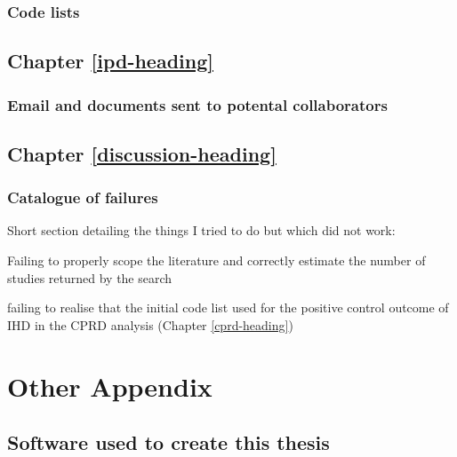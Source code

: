 \documentclass[a4paper, twoside]{templates/ociamthesis}
\begin{document}
\hypertarget{code-lists}{%
\subsection{Code lists}\label{code-lists}}

\hypertarget{appendix-ipd-analysis}{%
\section{Chapter \ref{ipd-heading}}\label{appendix-ipd-analysis}}

\hypertarget{ipd-email-collab}{%
\subsection{Email and documents sent to potental collaborators}\label{ipd-email-collab}}

\hypertarget{chapter-refdiscussion-heading}{%
\section{Chapter \ref{discussion-heading}}\label{chapter-refdiscussion-heading}}

\hypertarget{appendix-catalogue-failures}{%
\subsection{Catalogue of failures}\label{appendix-catalogue-failures}}

Short section detailing the things I tried to do but which did not work:

Failing to properly scope the literature and correctly estimate the number of studies returned by the search

failing to realise that the initial code list used for the positive control outcome of IHD in the CPRD analysis (Chapter \ref{cprd-heading})

\hypertarget{other-appendix-heading}{%
\chapter{Other Appendix}\label{other-appendix-heading}}

\hypertarget{software-used-to-create-this-thesis}{%
\section{Software used to create this thesis}\label{software-used-to-create-this-thesis}}
\end{document}
